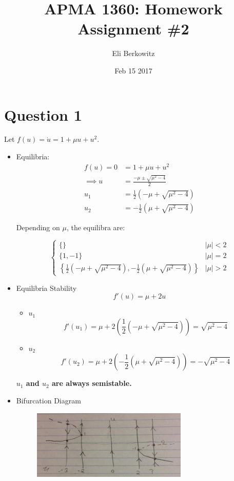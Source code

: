 \documentclass[12pt,a4paper]{article}
\title{APMA 1360: Homework Assignment \#2}
\author{Eli Berkowitz}
\date{Feb 15 2017}
\begin{document}
\maketitle

\section{Question 1}

Let $f(u) = \dot{u} = 1 + \mu u + u^2$.
\begin{itemize}
    \item Equilibria:
    \begin{align}
    f(u) = 0 &= 1 + \mu u + u^2 \\
             \implies u &= \frac{-\mu \pm \sqrt{\mu^2 - 4}}{2} \\
             u_1 &= \frac{1}{2}{\left( -\mu + \sqrt{\mu^2 - 4}\right)} \\
             u_2 &= -\frac{1}{2}{\left(\mu + \sqrt{\mu^2 - 4}\right)}
    \end{align}

    Depending on $\mu$, the equilibra are:

    $$\begin{cases}
        \{\} & |\mu| < 2 \\
        \{1, -1\} & |\mu| = 2 \\
        \left\{\frac{1}{2}{\left( -\mu + \sqrt{\mu^2 - 4}\right)},
        -\frac{1}{2}{\left(\mu + \sqrt{\mu^2 - 4}\right)}\right\} & |\mu| > 2
    \end{cases}
        $$
    \item Equilibria Stability
        $$f'(u) = \mu + 2u$$
    \begin{itemize}
        \item $u_1$ $$f'(u_1) = \mu + 2{\left(\frac{1}{2}{\left( -\mu + \sqrt{\mu^2 - 4}\right)}\right)} = \sqrt{\mu^2 - 4}$$
        \item $u_2$ $$f'(u_2) = \mu + 2{\left(-\frac{1}{2}{\left(\mu + \sqrt{\mu^2 - 4}\right)}\right)} = -\sqrt{\mu^2 - 4}$$
    \end{itemize}
    \textbf{$u_1$ and $u_2$ are always semistable.}
    \item Bifurcation Diagram
    \begin{figure}[H]
        \centering
        \includegraphics[width=0.7\textwidth]{q1-bifurcation}
    \end{figure}

\end{itemize}
\end{document}
